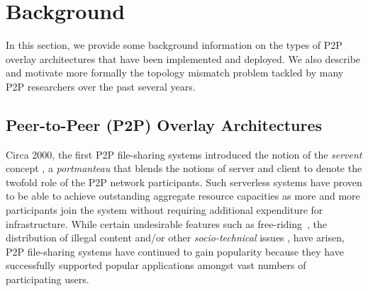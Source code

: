 \section{Background}
\label{section:background}


In this section, we provide some background information on the types
of P2P overlay architectures that have been implemented and deployed.  We also
describe and motivate more formally the topology mismatch problem tackled
by many P2P researchers over the past several years.

 

\subsection{Peer-to-Peer (P2P) Overlay Architectures}
Circa 2000, the first P2P file-sharing systems introduced the notion 
of the \emph{servent} concept \cite{gnutella}, a \emph{portmanteau} that blends
the notions of server and client to denote the twofold role of the P2P network
participants. Such serverless systems have proven to be able to achieve outstanding
aggregate resource capacities as more and more participants join the system
without requiring additional expenditure for infrastructure.  While
certain undesirable features such as 
free-riding~\cite{saroiu_measurefileshare_2002,adar_gnutellafreeriders_2000,hughes_gnutellafreeride_2005},
the distribution of illegal content and/or other \emph{socio-technical}
issues \cite{hughes_socp2p_2008}, have arisen, P2P file-sharing systems 
have continued
to gain popularity because they have successfully supported
popular
applications amongst vast numbers of participating
users. 

